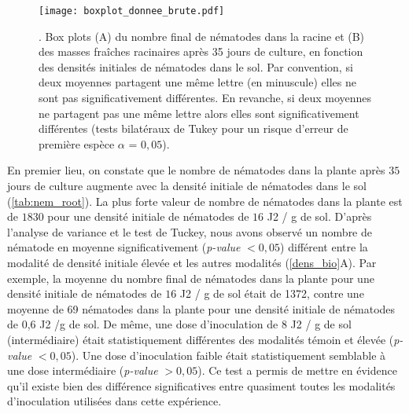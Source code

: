 	 	\begin{figure} 
		  \centering
			\texttt{[image: boxplot\_donnee\_brute.pdf]}
			\caption[Effet de la densité initiale de nématodes sur A) le nombre final de nématodes dans la racine et B) 
			la masse fraîche racinaire.]{. Box plots (A)   du nombre  final de nématodes dans la racine et (B)   des 
			masses fraîches racinaires après 35 jours de culture,  en fonction des densités initiales de nématodes dans 
		    le sol. Par convention, si deux moyennes partagent une même lettre (en minuscule) elles ne  sont pas 
            significativement différentes. En revanche, si deux moyennes ne partagent pas une même lettre alors elles   
            sont significativement différentes   (tests bilatéraux de Tukey pour un risque d’erreur de première espèce 
            $\alpha$ = $0,05$). } 
			\label{dens_bio}
		\end{figure}
		
	
	En premier lieu, on constate que  le nombre de nématodes dans la plante après $35$ jours de culture augmente avec la densité initiale de nématodes dans le sol	(\autoref{tab:nem_root}).
La plus forte valeur de nombre de nématodes dans la plante est de   $1830$ pour une densité initiale de nématodes de $16$  J2 / g de sol. %
	  D’après l'analyse de variance et  le test de Tuckey, nous avons observé  un nombre de nématode en moyenne  significativement (\textit{p-value} $< 0,05$)  différent entre la modalité de densité initiale élevée et  les autres modalités (\autoref{dens_bio}A). Par exemple, la moyenne du nombre final de nématodes  dans la plante pour une densité initiale de nématodes de $16$ J2 / g de sol était de 1372, contre une moyenne de 69 nématodes dans la plante pour une densité initiale de nématodes de 0,6 J2 /g de sol. De même, une dose d'inoculation de 8 J2 / g de sol (intermédiaire) était statistiquement différentes  des  modalités témoin et élevée (\textit{p-value} $< 0,05$). Une dose d'inoculation faible  était statistiquement semblable à une dose intermédiaire (\textit{p-value} $> 0,05$).  Ce test a permis de mettre en évidence qu'il existe bien des différence significatives entre quasiment toutes les modalités d'inoculation utilisées dans cette expérience. 
	    
